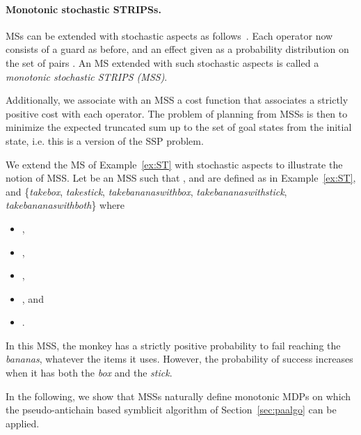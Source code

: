 \paragraph{Monotonic stochastic STRIPSs.} MSs can be extended with stochastic aspects as follows~\cite{blum2000probabilistic}. Each operator  now consists of a guard  as before, and an effect given as a probability distribution  on the set of pairs . An MS extended with such stochastic aspects is called a \textit{monotonic stochastic STRIPS (MSS)}. 

\noindent
Additionally, we associate with an MSS  a cost function  that associates a strictly positive cost with each operator. The problem of planning from MSSs is then to minimize the expected truncated sum up to the set of goal states from the initial state, i.e. this is a version of the SSP problem.

\begin{example}\label{ex:mst}
We extend the MS of Example~\ref{ex:ST} with stochastic aspects to illustrate the notion of MSS. Let  be an MSS such that ,  and  are defined as in Example~\ref{ex:ST}, and  \{\textit{takebox}, \textit{takestick}, \textit{takebananaswithbox}, \textit{takebananaswithstick}, \textit{takebananaswithboth}\} where 
\begin{itemize}
\item ,
\item ,
\item ,
\item , and 
\item .
\end{itemize}
In this MSS, the monkey has a strictly positive probability to fail reaching the \textit{bananas}, whatever the items it uses. However, the probability of success increases when it has both the \textit{box} and the \textit{stick}.
\end{example}

In the following, we show that MSSs naturally define monotonic MDPs on which the pseudo-antichain based symblicit algorithm of Section~\ref{sec:paalgo} can be applied.

